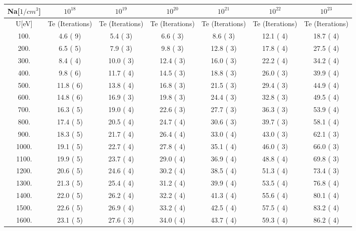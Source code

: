 \begin{tabular}{|c||c|c|c|c|c|c|}
\hline
Na[$1/cm^3$] & $10^{18}$ & $10^{19}$ & $10^{20}$ & $10^{21}$ & $10^{22}$ & $10^{23}$\tabularnewline
\hline
U[eV] & Te (Iterations) &  Te (Iterations) &  Te (Iterations) &  Te (Iterations) &  Te (Iterations) &  Te (Iterations) \tabularnewline
\hline
\hline
  100. &     4.6 (      9) &     5.4 (      3) &     6.6 (      3) &     8.6 (      3) &    12.1 (      4) &    18.7 (      4)\tabularnewline
\hline
  200. &     6.5 (      5) &     7.9 (      3) &     9.8 (      3) &    12.8 (      3) &    17.8 (      4) &    27.5 (      4)\tabularnewline
\hline
  300. &     8.4 (      4) &    10.0 (      3) &    12.4 (      3) &    16.0 (      3) &    22.2 (      4) &    34.2 (      4)\tabularnewline
\hline
  400. &     9.8 (      6) &    11.7 (      4) &    14.5 (      3) &    18.8 (      3) &    26.0 (      3) &    39.9 (      4)\tabularnewline
\hline
  500. &    11.8 (      6) &    13.8 (      4) &    16.8 (      3) &    21.5 (      3) &    29.4 (      3) &    44.9 (      4)\tabularnewline
\hline
  600. &    14.8 (      6) &    16.9 (      3) &    19.8 (      3) &    24.4 (      3) &    32.8 (      3) &    49.5 (      4)\tabularnewline
\hline
  700. &    16.3 (      5) &    19.0 (      4) &    22.6 (      3) &    27.7 (      3) &    36.3 (      3) &    53.9 (      4)\tabularnewline
\hline
  800. &    17.4 (      5) &    20.5 (      4) &    24.7 (      4) &    30.6 (      3) &    39.7 (      3) &    58.1 (      4)\tabularnewline
\hline
  900. &    18.3 (      5) &    21.7 (      4) &    26.4 (      4) &    33.0 (      4) &    43.0 (      3) &    62.1 (      3)\tabularnewline
\hline
 1000. &    19.1 (      5) &    22.7 (      4) &    27.8 (      4) &    35.1 (      4) &    46.0 (      3) &    66.0 (      3)\tabularnewline
\hline
 1100. &    19.9 (      5) &    23.7 (      4) &    29.0 (      4) &    36.9 (      4) &    48.8 (      4) &    69.8 (      3)\tabularnewline
\hline
 1200. &    20.6 (      5) &    24.6 (      4) &    30.2 (      4) &    38.5 (      4) &    51.3 (      4) &    73.4 (      3)\tabularnewline
\hline
 1300. &    21.3 (      5) &    25.4 (      4) &    31.2 (      4) &    39.9 (      4) &    53.5 (      4) &    76.8 (      4)\tabularnewline
\hline
 1400. &    22.0 (      5) &    26.2 (      4) &    32.2 (      4) &    41.3 (      4) &    55.6 (      4) &    80.1 (      4)\tabularnewline
\hline
 1500. &    22.6 (      5) &    26.9 (      4) &    33.2 (      4) &    42.5 (      4) &    57.5 (      4) &    83.2 (      4)\tabularnewline
\hline
 1600. &    23.1 (      5) &    27.6 (      3) &    34.0 (      4) &    43.7 (      4) &    59.3 (      4) &    86.2 (      4)\tabularnewline

\end{tabular}
